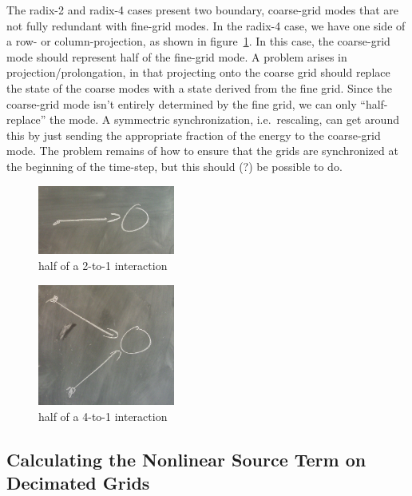\documentclass[10pt,showpacs,showkeys,%
amsfonts,amsmath,onecolumn,
floatfix,aps,superscriptaddress]{revtex4}
\begin{document}
The radix-2 and radix-4 cases present two boundary, coarse-grid modes
that are not fully redundant with fine-grid modes.  In the radix-4
case, we have one side of a row- or column-projection, as shown in
figure~\ref{bpair}. In this case, the coarse-grid mode should
represent half of the fine-grid mode. A problem arises in
projection/prolongation, in that projecting onto the coarse grid
should replace the state of the coarse modes with a state derived from
the fine grid.  Since the coarse-grid mode isn't entirely determined
by the fine grid, we can only ``half-replace'' the mode. A symmectric
synchronization, i.e.\ rescaling, can get around this by just sending
the appropriate fraction of the energy to the coarse-grid mode.  The
problem remains of how to ensure that the grids are synchronized at
the beginning of the time-step, but this should (?) be possible to do.


\begin{figure}[htbp]
  \begin{center}
    \includegraphics[width=0.4\textwidth]{figures/bpair.jpg}
    \caption{half of a 2-to-1 interaction}
    \label{bpair}
  \end{center}
\end{figure}
\begin{figure}[htbp]
  \begin{center}
    \includegraphics[width=0.4\textwidth]{figures/bquad.jpg}
    \caption{half of a 4-to-1 interaction}
    \label{bquad}
  \end{center}
\end{figure}


\subsection{Calculating the Nonlinear Source Term on Decimated Grids}
\end{document}
